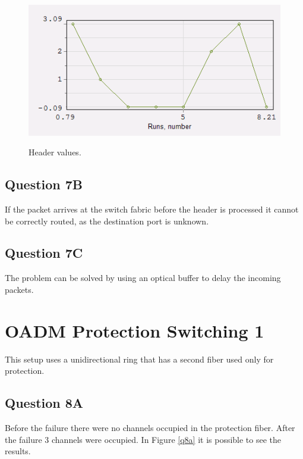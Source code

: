 \documentclass[a4paper,10pt]{report}
\begin{document}
\begin{figure}[!ht]
   \centering
   \includegraphics[width=12cm]{q7a.png}\\
   \caption{Header values.}
   \label{q7a}
\end{figure}

\subsection*{Question 7B}
If the packet arrives at the switch fabric before the header is processed it cannot be correctly routed,
as the destination port is unknown.

\subsection*{Question 7C}
The problem can be solved by using an optical buffer to delay the incoming packets.


\newpage
\section*{OADM Protection Switching 1}
This setup uses a unidirectional ring that has a second fiber used only for protection.

\subsection*{Question 8A}
Before the failure there were no channels occupied in the protection fiber. After the failure 3 channels were occupied.
In Figure \ref{q8a} it is possible to see the results.
\end{document}
